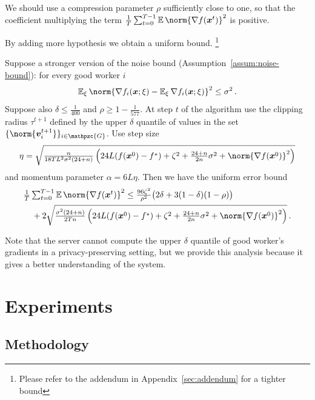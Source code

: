 \documentclass{article}
\newcommand{\gset}{\ensuremath{{\mathpzc{G}}}}
\begin{document}
We should use a compression parameter $\rho$ sufficiently close to one, so that the coefficient multiplying the term $\tfrac{1}{T} \tsum_{t=0}^{T-1} \E \norm{\nabla f(\xx^t)}^2$ is positive.

By adding more hypothesis we obtain a uniform bound. \footnote{Please refer to the addendum in Appendix~\ref{sec:addendum} for a tighter bound}

\begin{theorem}\label{thm:convergence-byz-uniform}
  Suppose a stronger version of the noise bound (Assumption~\ref{assum:noise-bound}): for every good worker $i$
\[
  \E_\xi \norm{\nabla f_i(\xx; \xi) - \E_\xi \nabla f_i(\xx; \xi)}^2 \leq \sigma^2 \, .
\]
  Suppose also $\delta \le \tfrac{1}{400}$ and $\rho \ge 1 - \tfrac{1}{577}$. At step $t$ of the algorithm use the clipping radius $\tau^{t+1}$ defined by the upper $\delta$ quantile of values in the set $\{\norm{\vv_i^{t+1}}\}_{i\in\gset}$. 
  Use step size
  \[
    \eta 
    =
    \sqrt{
      \tfrac{n}{18 T L^2 \sigma^2 (24+n)}
      \left(
        24L(f(\xx^0) - f^\ast)
        +
        \zeta^2
        +
        \tfrac{24+n}{2n} \sigma^2 
        +
        \norm{\nabla f(\xx^0) }^2
      \right)
    }
  \] 
  and momentum parameter $\alpha = 6 L \eta$. 
  Then we have the uniform error bound 
  \begin{align*}
    & \tfrac{1}{T} \tsum_{t=0}^{T-1} \E \norm{\nabla f(\xx^t)}^2 
    \le  
    \tfrac{96 \zeta^2}{\rho^2} 
    \bigl(
      2 \delta + 3(1-\delta)(1-\rho)
    \bigr)
    \\
    &\quad 
    + 2 \sqrt{
    \tfrac{\sigma^2 (24+n)}{2 T n}
    \left(
      24L(f(\xx^0) - f^\ast)
      +
      \zeta^2
      +
      \tfrac{24+n}{2n} \sigma^2 
      +
      \norm{\nabla f(\xx^0) }^2
    \right)
    }
    \, .
  \end{align*}
\end{theorem}

Note that the server cannot compute the upper $\delta$ quantile of good worker's gradients in a privacy-preserving setting, but we provide this analysis because it gives a better understanding of the system.


\section{Experiments}


\subsection{Methodology}
\end{document}
